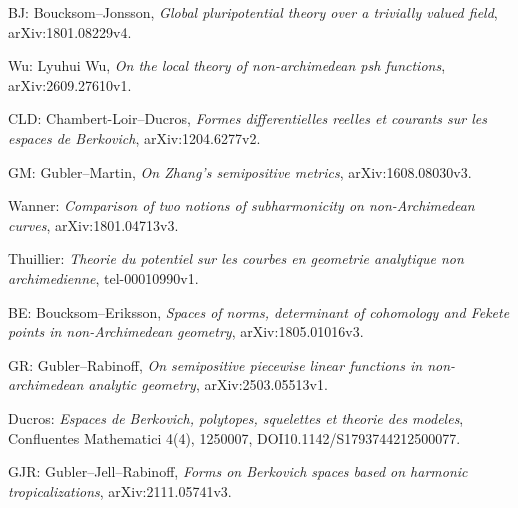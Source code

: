 \documentclass[
  10pt,
]{article}
\begin{document}
BJ: Boucksom--Jonsson, \emph{Global pluripotential theory over a
trivially valued field}, arXiv:1801.08229v4.

Wu: Lyuhui Wu, \emph{On the local theory of non-archimedean psh
functions}, arXiv:2609.27610v1.

CLD: Chambert-Loir--Ducros, \emph{Formes differentielles reelles et
courants sur les espaces de Berkovich}, arXiv:1204.6277v2.

GM: Gubler--Martin, \emph{On Zhang's semipositive metrics},
arXiv:1608.08030v3.

Wanner: \emph{Comparison of two notions of subharmonicity on
non-Archimedean curves}, arXiv:1801.04713v3.

Thuillier: \emph{Theorie du potentiel sur les courbes en geometrie
analytique non archimedienne}, tel-00010990v1.

BE: Boucksom--Eriksson, \emph{Spaces of norms, determinant of cohomology
and Fekete points in non-Archimedean geometry}, arXiv:1805.01016v3.

GR: Gubler--Rabinoff, \emph{On semipositive piecewise linear functions
in non-archimedean analytic geometry}, arXiv:2503.05513v1.

Ducros: \emph{Espaces de Berkovich, polytopes, squelettes et theorie des
modeles}, Confluentes Mathematici 4(4), 1250007,
DOI10.1142/S1793744212500077.

GJR: Gubler--Jell--Rabinoff, \emph{Forms on Berkovich spaces based on
harmonic tropicalizations}, arXiv:2111.05741v3.
\end{document}
